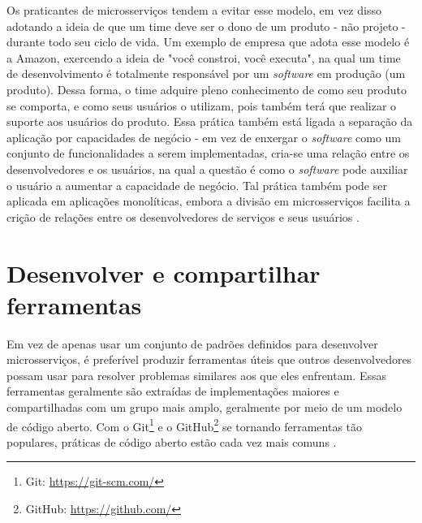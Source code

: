 Os praticantes de microsserviços tendem a evitar esse modelo, em vez disso adotando a ideia de que um time deve ser o dono de um produto - não projeto - durante todo seu ciclo de vida. Um exemplo de empresa que adota esse modelo é a Amazon, exercendo a ideia de "você constroi, você executa", na qual um time de desenvolvimento é totalmente responsável por um \emph{software} em produção (um produto). Dessa forma, o time adquire pleno conhecimento de como seu produto se comporta, e como seus usuários o utilizam, pois também terá que realizar o suporte aos usuários do produto. Essa prática também está ligada a separação da aplicação por capacidades de negócio - em vez de enxergar o \emph{software} como um conjunto de funcionalidades a serem implementadas, cria-se uma relação entre os desenvolvedores e os usuários, na qual a questão é como o \emph{software} pode auxiliar o usuário a aumentar a capacidade de negócio. Tal prática também pode ser aplicada em aplicações monolíticas, embora a divisão em microsserviços facilita a crição de relações entre os desenvolvedores de serviços e seus usuários \cite{martin-fowler-microservices}.



\section{Desenvolver e compartilhar ferramentas}
Em vez de apenas usar um conjunto de padrões definidos para desenvolver microsserviços, é preferível produzir ferramentas úteis que outros desenvolvedores possam usar para resolver problemas similares aos que eles enfrentam. Essas ferramentas geralmente são extraídas de implementações maiores e compartilhadas com um grupo mais amplo, geralmente por meio de um modelo de código aberto. Com o Git\footnote{Git: \url{https://git-scm.com/}} e o GitHub\footnote{GitHub: \url{https://github.com/}} se tornando ferramentas tão populares, práticas de código aberto estão cada vez mais comuns \cite{martin-fowler-microservices}.

